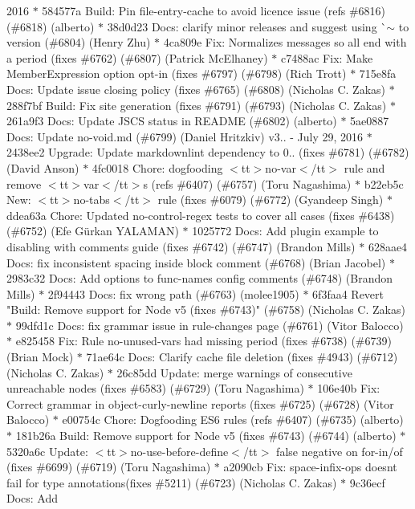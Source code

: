 \begin{DoxyItemize}
2016  \texorpdfstring{$\ast$}{*} 584577a Build\+: Pin file-\/entry-\/cache to avoid licence issue (refs \#6816) (\#6818) (alberto) \texorpdfstring{$\ast$}{*} 38d0d23 Docs\+: clarify minor releases and suggest using \`{}\texorpdfstring{$\sim$}{\string~} to version (\#6804) (\+Henry Zhu) \texorpdfstring{$\ast$}{*} 4ca809e Fix\+: Normalizes messages so all end with a period (fixes \#6762) (\#6807) (\+Patrick Mc\+Elhaney) \texorpdfstring{$\ast$}{*} c7488ac Fix\+: Make Member\+Expression option opt-\/in (fixes \#6797) (\#6798) (\+Rich Trott) \texorpdfstring{$\ast$}{*} 715e8fa Docs\+: Update issue closing policy (fixes \#6765) (\#6808) (\+Nicholas C. Zakas) \texorpdfstring{$\ast$}{*} 288f7bf Build\+: Fix site generation (fixes \#6791) (\#6793) (\+Nicholas C. Zakas) \texorpdfstring{$\ast$}{*} 261a9f3 Docs\+: Update JSCS status in README (\#6802) (alberto) \texorpdfstring{$\ast$}{*} 5ae0887 Docs\+: Update no-\/void.\+md (\#6799) (\+Daniel Hritzkiv)  v3.. -\/ July 29, 2016  \texorpdfstring{$\ast$}{*} 2438ee2 Upgrade\+: Update markdownlint dependency to 0.. (fixes \#6781) (\#6782) (\+David Anson) \texorpdfstring{$\ast$}{*} 4fc0018 Chore\+: dogfooding $<$tt$>$no-\/var$<$/tt$>$ rule and remove $<$tt$>$var$<$/tt$>$s (refs \#6407) (\#6757) (\+Toru Nagashima) \texorpdfstring{$\ast$}{*} b22eb5c New\+: $<$tt$>$no-\/tabs$<$/tt$>$ rule (fixes \#6079) (\#6772) (\+Gyandeep Singh) \texorpdfstring{$\ast$}{*} ddea63a Chore\+: Updated no-\/control-\/regex tests to cover all cases (fixes \#6438) (\#6752) (\+Efe Gürkan YALAMAN) \texorpdfstring{$\ast$}{*} 1025772 Docs\+: Add plugin example to disabling with comments guide (fixes \#6742) (\#6747) (\+Brandon Mills) \texorpdfstring{$\ast$}{*} 628aae4 Docs\+: fix inconsistent spacing inside block comment (\#6768) (\+Brian Jacobel) \texorpdfstring{$\ast$}{*} 2983c32 Docs\+: Add options to func-\/names config comments (\#6748) (\+Brandon Mills) \texorpdfstring{$\ast$}{*} 2f94443 Docs\+: fix wrong path (\#6763) (molee1905) \texorpdfstring{$\ast$}{*} 6f3faa4 Revert "{}Build\+: Remove support for Node v5 (fixes \#6743)"{} (\#6758) (\+Nicholas C. Zakas) \texorpdfstring{$\ast$}{*} 99dfd1c Docs\+: fix grammar issue in rule-\/changes page (\#6761) (\+Vitor Balocco) \texorpdfstring{$\ast$}{*} e825458 Fix\+: Rule no-\/unused-\/vars had missing period (fixes \#6738) (\#6739) (\+Brian Mock) \texorpdfstring{$\ast$}{*} 71ae64c Docs\+: Clarify cache file deletion (fixes \#4943) (\#6712) (\+Nicholas C. Zakas) \texorpdfstring{$\ast$}{*} 26c85dd Update\+: merge warnings of consecutive unreachable nodes (fixes \#6583) (\#6729) (\+Toru Nagashima) \texorpdfstring{$\ast$}{*} 106e40b Fix\+: Correct grammar in object-\/curly-\/newline reports (fixes \#6725) (\#6728) (\+Vitor Balocco) \texorpdfstring{$\ast$}{*} e00754c Chore\+: Dogfooding ES6 rules (refs \#6407) (\#6735) (alberto) \texorpdfstring{$\ast$}{*} 181b26a Build\+: Remove support for Node v5 (fixes \#6743) (\#6744) (alberto) \texorpdfstring{$\ast$}{*} 5320a6c Update\+: $<$tt$>$no-\/use-\/before-\/define$<$/tt$>$ false negative on for-\/in/of (fixes \#6699) (\#6719) (\+Toru Nagashima) \texorpdfstring{$\ast$}{*} a2090cb Fix\+: space-\/infix-\/ops doesn\textquotesingle{}t fail for  type annotations(fixes \#5211) (\#6723) (\+Nicholas C. Zakas) \texorpdfstring{$\ast$}{*} 9c36ecf Docs\+: Add 
\end{DoxyItemize}
